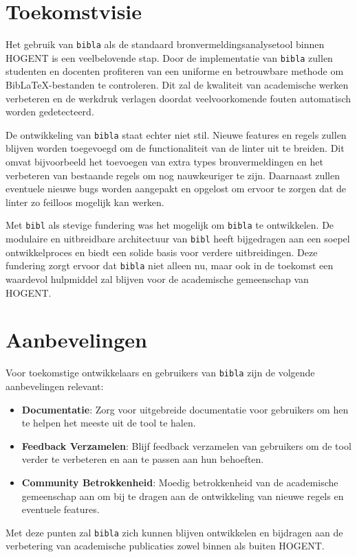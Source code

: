 \section{Toekomstvisie}
Het gebruik van \texttt{bibla} als de standaard bronvermeldingsanalysetool binnen HOGENT is een veelbelovende stap. Door de implementatie van \texttt{bibla} zullen studenten en docenten profiteren van een uniforme en betrouwbare methode om BibLaTeX-bestanden te controleren. Dit zal de kwaliteit van academische werken verbeteren en de werkdruk verlagen doordat veelvoorkomende fouten automatisch worden gedetecteerd.

De ontwikkeling van \texttt{bibla} staat echter niet stil. Nieuwe features en regels zullen blijven worden toegevoegd om de functionaliteit van de linter uit te breiden. Dit omvat bijvoorbeeld het toevoegen van extra types bronvermeldingen en het verbeteren van bestaande regels om nog nauwkeuriger te zijn. Daarnaast zullen eventuele nieuwe bugs worden aangepakt en opgelost om ervoor te zorgen dat de linter zo feilloos mogelijk kan werken.

Met \texttt{bibl} als stevige fundering was het mogelijk om \texttt{bibla} te ontwikkelen. De modulaire en uitbreidbare architectuur van \texttt{bibl} heeft bijgedragen aan een soepel ontwikkelproces en biedt een solide basis voor verdere uitbreidingen. Deze fundering zorgt ervoor dat \texttt{bibla} niet alleen nu, maar ook in de toekomst een waardevol hulpmiddel zal blijven voor de academische gemeenschap van HOGENT.

\section{Aanbevelingen}

Voor toekomstige ontwikkelaars en gebruikers van \texttt{bibla} zijn de volgende aanbevelingen relevant:
\begin{itemize}
  \item \textbf{Documentatie}: Zorg voor uitgebreide documentatie voor gebruikers om hen te helpen het meeste uit de tool te halen.
  \item \textbf{Feedback Verzamelen}: Blijf feedback verzamelen van gebruikers om de tool verder te verbeteren en aan te passen aan hun behoeften.
  \item \textbf{Community Betrokkenheid}: Moedig betrokkenheid van de academische gemeenschap aan om bij te dragen aan de ontwikkeling van nieuwe regels en eventuele features.
\end{itemize}

Met deze punten zal \texttt{bibla} zich kunnen blijven ontwikkelen en bijdragen aan de verbetering van academische publicaties zowel binnen als buiten HOGENT.
